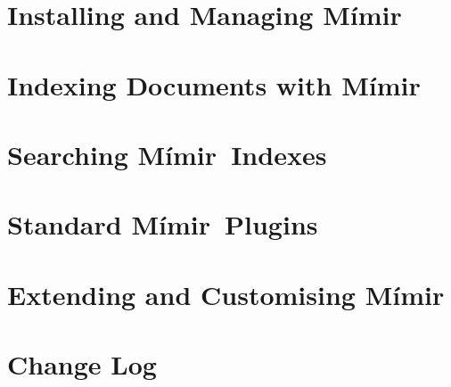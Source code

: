 \documentclass[10pt, a4paper, twoside]{report}
\newcommand{\Mimir}{M\'{i}mir}
\begin{document}
\chapter{Installing and Managing \Mimir}\label{sec:admin}

\chapter{Indexing Documents with \Mimir}\label{sec:indexing}

\chapter{Searching \Mimir\ Indexes}\label{sec:searching}

\chapter{Standard \Mimir\ Plugins}\label{sec:plugins}

\chapter{Extending and Customising \Mimir}\label{sec:extend}


\appendix
\chapter{Change Log}\label{sec:changes}

\end{document}

